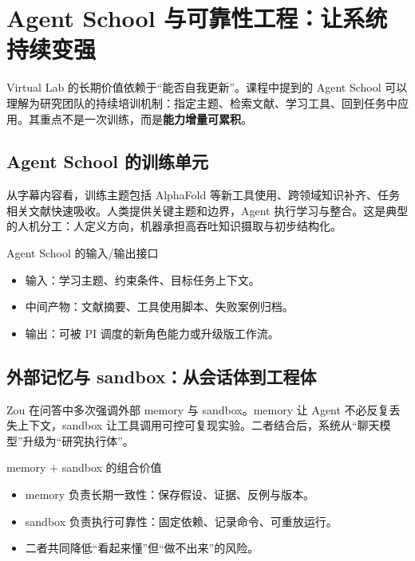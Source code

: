 \documentclass[a4paper]{article}
\begin{document}
\section{Agent School 与可靠性工程：让系统持续变强}

Virtual Lab 的长期价值依赖于``能否自我更新''。课程中提到的 Agent School 可以理解为研究团队的持续培训机制：指定主题、检索文献、学习工具、回到任务中应用。其重点不是一次训练，而是\textbf{能力增量可累积}。

\subsection{Agent School 的训练单元}

从字幕内容看，训练主题包括 AlphaFold 等新工具使用、跨领域知识补齐、任务相关文献快速吸收。人类提供关键主题和边界，Agent 执行学习与整合。这是典型的人机分工：人定义方向，机器承担高吞吐知识摄取与初步结构化。

\begin{knowledgebox}{Agent School 的输入/输出接口}
\begin{itemize}
    \item 输入：学习主题、约束条件、目标任务上下文。
    \item 中间产物：文献摘要、工具使用脚本、失败案例归档。
    \item 输出：可被 PI 调度的新角色能力或升级版工作流。
\end{itemize}
\end{knowledgebox}

\subsection{外部记忆与 sandbox：从会话体到工程体}

Zou 在问答中多次强调外部 memory 与 sandbox。memory 让 Agent 不必反复丢失上下文，sandbox 让工具调用可控可复现实验。二者结合后，系统从``聊天模型''升级为``研究执行体''。

\begin{importantbox}{memory + sandbox 的组合价值}
\begin{itemize}
    \item memory 负责长期一致性：保存假设、证据、反例与版本。
    \item sandbox 负责执行可靠性：固定依赖、记录命令、可重放运行。
    \item 二者共同降低``看起来懂''但``做不出来''的风险。
\end{itemize}
\end{importantbox}
\end{document}
